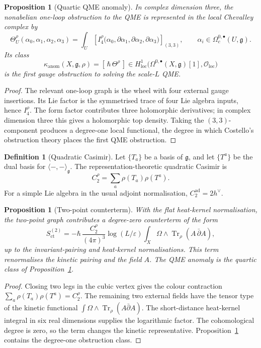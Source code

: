 \documentclass[11pt]{amsart}
\providecommand{\hb}{\hbar}
\providecommand{\dbar}{\bar{\partial}}
\providecommand{\g}{\mathfrak{g}}
\providecommand{\Tr}{\operatorname{Tr}}
\providecommand{\cO}{\mathcal{O}}
\providecommand{\kanom}{\kappa_{\mathrm{anom}}}
\theoremstyle{plain}
\newtheorem{proposition}[theorem]{Proposition}
\theoremstyle{definition}
\newtheorem{definition}[theorem]{Definition}
\theoremstyle{remark}
\begin{document}
\begin{proposition}[Quartic QME anomaly]\label{prop:e2-qme-obstruction}
In complex dimension three, the nonabelian one-loop obstruction to the
QME is represented in the local Chevalley complex by
\[
 \Theta^\rho_U(\alpha_0,\alpha_1,\alpha_2,\alpha_3)
 =
 \int_U
 \left[
 I_4^\rho\bigl(
  \alpha_0,\partial\alpha_1,\partial\alpha_2,\partial\alpha_3
 \bigr)
 \right]_{(3,3)},
 \qquad
 \alpha_i\in\Omega_c^{0,\bullet}(U,\g).
\]
Its class
\[
 \kanom(X,\g,\rho)
 =
 [\,\hb\,\Theta^\rho\,]
 \in
 H^1_{\mathrm{loc}}
 \bigl(\Omega^{0,\bullet}(X,\g)[1],\cO_{\mathrm{loc}}\bigr)
\]
is the first gauge obstruction to solving the scale-\(L\) QME.
\end{proposition}

\begin{proof}
The relevant one-loop graph is the wheel with four external gauge
insertions. Its Lie factor is the symmetrised trace of four Lie algebra
inputs, hence \(I_4^\rho\). The form factor contributes three
holomorphic derivatives; in complex dimension three this gives a
holomorphic top density. Taking the \((3,3)\)-component produces a
degree-one local functional, the degree in which Costello's obstruction
theory places the first QME obstruction.
\end{proof}

\begin{definition}[Quadratic Casimir]\label{def:e2-casimir}
Let \(\{T_a\}\) be a basis of \(\g\), and let \(\{T^a\}\) be the dual
basis for \(\langle-,-\rangle_\g\). The representation-theoretic
quadratic Casimir is
\[
 C_2^\rho=\sum_a\rho(T_a)\rho(T^a).
\]
For a simple Lie algebra in the usual adjoint normalisation,
\(C_2^{\mathrm{ad}}=2h^\vee\).
\end{definition}

\begin{proposition}[Two-point counterterm]\label{prop:e2-c2-counterterm}
With the flat heat-kernel normalisation, the two-point graph contributes
a degree-zero counterterm of the form
\[
 S_{\mathrm{ct}}^{(2)}
 =
 -\hb\,\frac{C_2^\rho}{(4\pi)^3}
 \log(L/\varepsilon)
 \int_X\Omega\wedge\Tr_\rho(A\,\dbar A),
\]
up to the invariant-pairing and heat-kernel normalisations. This term
renormalises the kinetic pairing and the field \(A\). The QME anomaly
is the quartic class of Proposition~\ref{prop:e2-qme-obstruction}.
\end{proposition}

\begin{proof}
Closing two legs in the cubic vertex gives the colour contraction
\(\sum_a\rho(T_a)\rho(T^a)=C_2^\rho\). The remaining two external
fields have the tensor type of the kinetic functional
\(\int\Omega\wedge\Tr_\rho(A\dbar A)\). The short-distance heat-kernel
integral in six real dimensions supplies the logarithmic factor. The
cohomological degree is zero, so the term changes the kinetic
representative. Proposition~\ref{prop:e2-qme-obstruction} contains the
degree-one obstruction class.
\end{proof}
\end{document}
